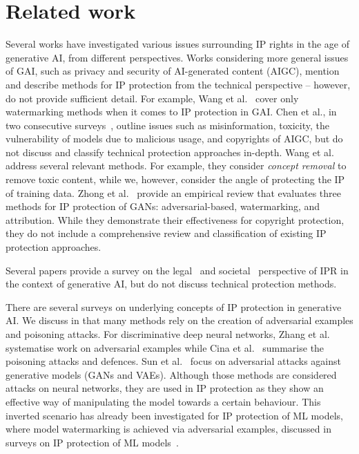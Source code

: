 \documentclass[conference,table]{IEEEtran}
\begin{document}
\section{Related work}\label{sec:related-work}
Several works have investigated various issues surrounding IP rights in the age of generative AI, from different perspectives.
Works considering more general issues of GAI, such as privacy and security of AI-generated content (AIGC), mention and describe methods for IP protection from the technical perspective -- however, do not provide sufficient detail. For example, Wang et al.~\cite{wang_survey_2023} cover only watermarking methods when it comes to IP protection in GAI. Chen et al., in two consecutive surveys~\cite{chen_challenges_2023,chen_pathway_2023}, outline issues such as misinformation, toxicity, the vulnerability of models due to malicious usage, and copyrights of AIGC, but do not discuss and classify technical protection approaches in-depth.
Wang et al.~\cite{wang_security_2023} address several relevant methods. For example, they consider \textit{concept removal} to remove toxic content, while we, however, consider the angle of protecting the IP of training data.
Zhong et al.~\cite{zhong_copyright_2023} provide an empirical review that evaluates three methods for IP protection of GANs: adversarial-based, watermarking, and attribution. While they demonstrate their effectiveness for copyright protection, they do not include a comprehensive review and classification of existing IP protection approaches. 

Several papers provide a survey on the legal~\cite{smits_generative_2022,chesterman_good_2023} and societal~\cite{hristov_artificial_2020} perspective of IPR in the context of generative AI, but do not discuss technical protection methods. 

There are several surveys on underlying concepts of IP protection in generative AI. We discuss in  that many methods rely on the creation of adversarial examples and poisoning attacks. 
For discriminative deep neural networks, Zhang et al.~\cite{zhang_adversarial_2019} systematise work on adversarial examples while Cina et al.~\cite{cina_wild_2023} summarise the poisoning attacks and defences.
Sun et al.~\cite{sun_adversarial_2023} focus on adversarial attacks against generative models (GANs and VAEs).
Although those methods are considered attacks on neural networks, they are used in IP protection as they show an effective way of manipulating the model towards a certain behaviour. 
This inverted scenario has already been investigated for IP protection of ML models, where model watermarking is achieved via adversarial examples, discussed in surveys on IP protection of ML models~\cite{lederer_identifying_2023,regazzoni_protecting_2021}.
\end{document}
